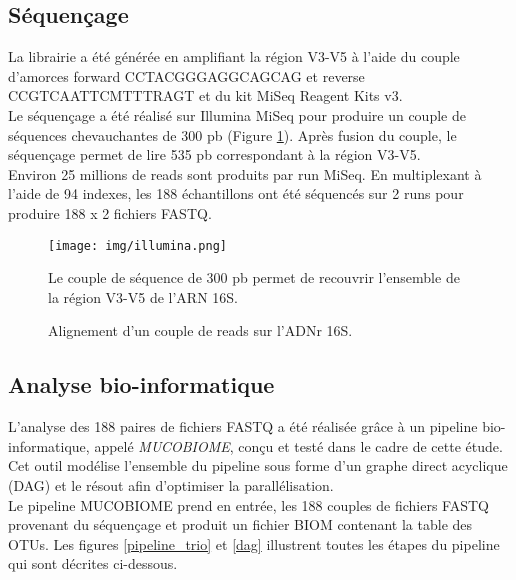 \documentclass[12pt,a4paper]{article}
\begin{document}
\subsection{Séquençage}
La librairie a été générée en amplifiant la région V3-V5 à l’aide du couple d’amorces forward CCTACGGGAGGCAGCAG et reverse CCGTCAATTCMTTTRAGT et du kit MiSeq Reagent Kits v3. \\
Le séquençage a été réalisé sur Illumina MiSeq pour produire un couple de séquences chevauchantes de 300 pb (Figure \ref{illumina}). Après fusion du couple, le séquençage permet de lire  535 pb correspondant à la région V3-V5.\\
Environ 25 millions de reads sont produits par run MiSeq. En multiplexant à l’aide de 94 indexes, les 188 échantillons ont été séquencés sur 2 runs pour produire 188 x 2 fichiers FASTQ.

\begin{figure}[ht]
\begin{center}
\texttt{[image: img/illumina.png]}\hfill
\end{center}
\caption{Alignement d'un couple de reads sur l'ADNr 16S.}
Le couple de séquence de 300 pb permet de recouvrir l'ensemble de la région V3-V5 de l'ARN 16S.
\label{illumina}
\end{figure}


\subsection{Analyse bio-informatique}
L’analyse des 188 paires de fichiers FASTQ a été réalisée grâce à un pipeline bio-informatique, appelé \textit{MUCOBIOME}, conçu et testé dans le cadre de cette étude. Cet outil modélise l'ensemble du pipeline sous forme d'un graphe direct acyclique (DAG) et le résout afin d'optimiser la parallélisation. \\
Le pipeline MUCOBIOME prend en entrée, les 188 couples de fichiers FASTQ provenant du séquençage et produit un fichier BIOM contenant la table des OTUs. Les figures \ref{pipeline_trio} et \ref{dag} illustrent toutes les étapes du pipeline qui sont décrites ci-dessous.
\end{document}
